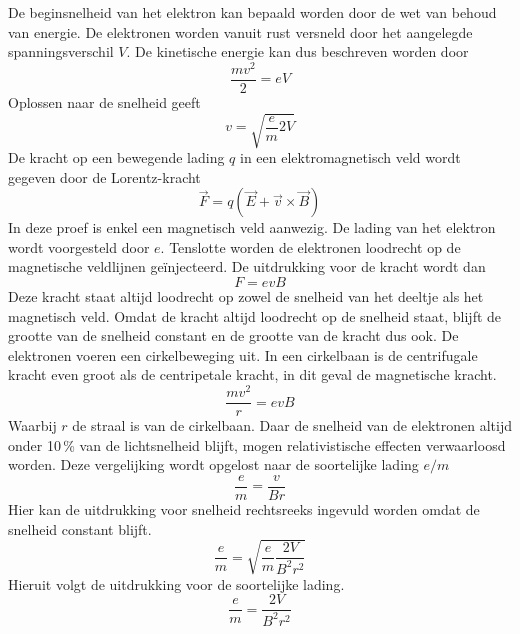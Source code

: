De beginsnelheid van het elektron kan bepaald worden door de wet van behoud van 
energie. De elektronen worden vanuit rust versneld door het aangelegde 
spanningsverschil $V$. De kinetische energie kan dus beschreven worden door
$$
\frac{mv^2}{2} = eV
$$
Oplossen naar de snelheid geeft
$$
v = \sqrt{ \frac{e}{m} 2V }
$$
De kracht op een bewegende lading $q$ in een elektromagnetisch veld wordt 
gegeven door de Lorentz-kracht
$$
\vec{F} = q(\vec{E} + \vec{v} \times \vec{B})
$$
In deze proef is enkel een magnetisch veld aanwezig. De lading van het elektron 
wordt voorgesteld door $e$. Tenslotte worden de elektronen loodrecht op de 
magnetische veldlijnen ge\"injecteerd. De uitdrukking voor de kracht wordt dan
$$
F = e v B
$$
Deze kracht staat altijd loodrecht op zowel de snelheid van het deeltje als het 
magnetisch veld. Omdat de kracht altijd loodrecht op de snelheid staat, blijft 
de grootte van de snelheid constant en de grootte van de kracht dus ook. De 
elektronen voeren een cirkelbeweging uit. In een cirkelbaan is de centrifugale 
kracht even groot als de centripetale kracht, in dit geval de magnetische 
kracht.
$$
\frac{mv^2}{r} = evB
$$
Waarbij $r$ de straal is van de cirkelbaan.
Daar de snelheid van de elektronen altijd onder 10\,\% van de lichtsnelheid 
blijft, mogen relativistische effecten verwaarloosd worden. Deze vergelijking 
wordt opgelost naar de soortelijke lading $e/m$
$$
\frac{e}{m} = \frac{v}{Br}
$$
Hier kan de uitdrukking voor snelheid rechtsreeks ingevuld worden omdat de 
snelheid constant blijft.
$$
\frac{e}{m} = \sqrt{\frac{e}{m} \frac{2V}{B^2r^2}}
$$
Hieruit volgt de uitdrukking voor de soortelijke lading.
$$
\frac{e}{m} = \frac{2V}{B^2r^2}
$$
